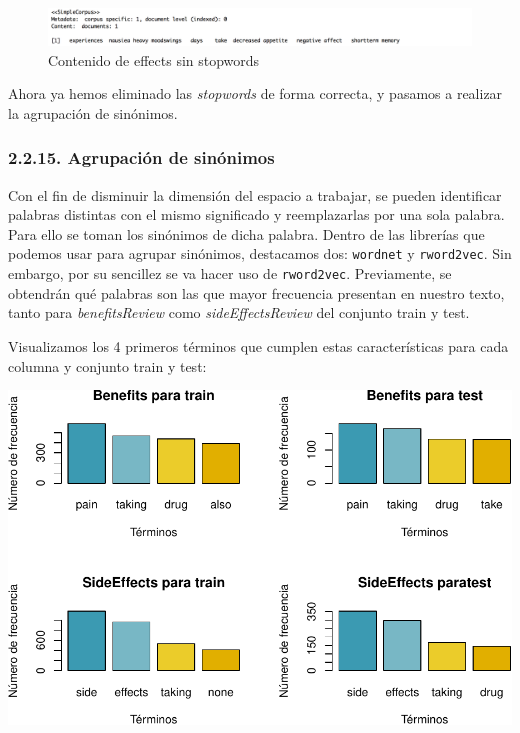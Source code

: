 \documentclass[spanish,]{article}
\begin{document}
\begin{figure}[h]
    \centering
    \includegraphics[width=1\textwidth]{imagenes/effects_stopwords.png}
    \caption{Contenido de effects sin stopwords}
    \label{benefits2}
\end{figure}

Ahora ya hemos eliminado las \emph{stopwords} de forma correcta, y
pasamos a realizar la agrupación de sinónimos.

\subsubsection{2.2.15. Agrupación de
sinónimos}\label{agrupacion-de-sinonimos}

Con el fin de disminuir la dimensión del espacio a trabajar, se pueden
identificar palabras distintas con el mismo significado y reemplazarlas
por una sola palabra. Para ello se toman los sinónimos de dicha palabra.
Dentro de las librerías que podemos usar para agrupar sinónimos,
destacamos dos: \texttt{wordnet} y \texttt{rword2vec}. Sin embargo, por
su sencillez se va hacer uso de \texttt{rword2vec}. Previamente, se
obtendrán qué palabras son las que mayor frecuencia presentan en nuestro
texto, tanto para \emph{benefitsReview} como \emph{sideEffectsReview}
del conjunto train y test.

Visualizamos los 4 primeros términos que cumplen estas características
para cada columna y conjunto train y test:

\includegraphics{practica-original_files/figure-latex/unnamed-chunk-41-1.pdf}
\end{document}
